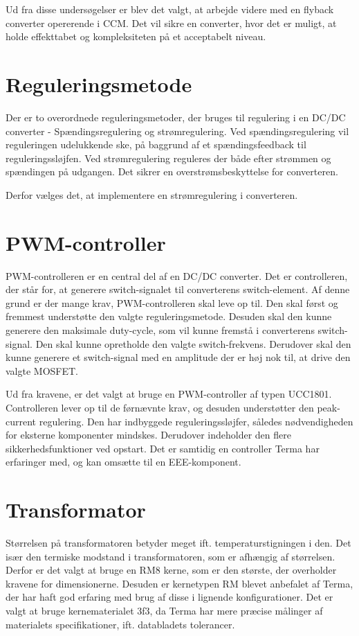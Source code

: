 Ud fra disse undersøgelser er blev det valgt, at arbejde videre med en flyback converter opererende i CCM. Det vil sikre en converter, hvor det er muligt, at holde effekttabet og kompleksiteten på et acceptabelt niveau. 

\section{Reguleringsmetode}
Der er to overordnede reguleringsmetoder, der bruges til regulering i en DC/DC converter - Spændingsregulering og strømregulering. Ved spændingsregulering vil reguleringen udelukkende ske, på baggrund af et spændingsfeedback til reguleringssløjfen. Ved strømregulering reguleres der både efter strømmen og spændingen på udgangen. Det sikrer en overstrømsbeskyttelse for converteren.

\noindent Derfor vælges det, at implementere en strømregulering i converteren. 

\section{PWM-controller}
PWM-controlleren er en central del af en DC/DC converter. Det er controlleren, der står for, at generere switch-signalet til converterens switch-element. Af denne grund er der mange krav, PWM-controlleren skal leve op til. Den skal først og fremmest understøtte den valgte reguleringsmetode. Desuden skal den kunne generere den maksimale duty-cycle, som vil kunne fremstå i converterens switch-signal. Den skal kunne opretholde den valgte switch-frekvens. Derudover skal den kunne generere et switch-signal med en amplitude der er høj nok til, at drive den valgte MOSFET.

Ud fra kravene, er det valgt at bruge en PWM-controller af typen UCC1801\cite{UCC1801}. Controlleren lever op til de førnævnte krav, og desuden understøtter den peak-current regulering. Den har indbyggede reguleringssløjfer, således nødvendigheden for eksterne komponenter mindskes. Derudover indeholder den flere sikkerhedsfunktioner ved opstart. Det er samtidig en controller Terma har erfaringer med, og kan omsætte til en EEE-komponent. 

\section{Transformator} \label{Transana}
Størrelsen på transformatoren betyder meget ift. temperaturstigningen i den. Det især den termiske modstand i transformatoren, som er afhængig af størrelsen\cite{epcos-cores}. Derfor er det valgt at bruge en RM8\cite{RM8} kerne, som er den største, der overholder kravene for dimensionerne. Desuden er kernetypen RM blevet anbefalet af Terma, der har haft god erfaring med brug af disse i lignende konfigurationer. Det er valgt at bruge kernematerialet 3f3\cite{3f3}, da Terma har mere præcise målinger af materialets specifikationer, ift. databladets tolerancer.

